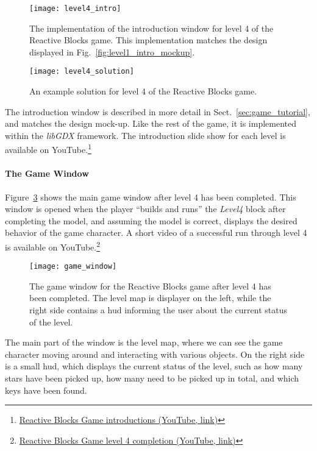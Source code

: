 \begin{figure}[htp]
	\centering
	\texttt{[image: level4\_intro]}
	\caption[Reactive Blocks game Level 4 introduction]{The implementation of the introduction window for level 4 of the Reactive Blocks game. This implementation matches the design displayed in Fig.~\ref{fig:level1_intro_mockup}.}
	\label{fig:level4_intro}
\end{figure}

\begin{figure}[htp]
	\centering
	\texttt{[image: level4\_solution]}
	\caption[Reactive Blocks game Level 4 solution]{An example solution for level 4 of the Reactive Blocks game.}
	\label{fig:level4_solution}
\end{figure}

\noindent
The introduction window is described in more detail in Sect.~\ref{sec:game_tutorial}, and matches the design mock-up. Like the rest of the game, it is implemented within the \emph{libGDX} framework. The introduction slide show for each level is available on YouTube.\footnote{\href{http://www.youtube.com/playlist?list=PLoqEHDwb_4oD8LT7n-7Q1dx67HxXwJN_K}{Reactive Blocks Game introductions (YouTube, link)}}

\paragraph{The Game Window}
Figure~\ref{fig:game_window} shows the main game window after level 4 has been completed. This window is opened when the player ``builds and runs'' the \emph{Level4} block after completing the model, and assuming the model is correct, displays the desired behavior of the game character. A short video of a successful run through level 4 is available on YouTube.\footnote{\href{http://youtu.be/Fe3CWCLogGs}{Reactive Blocks Game level 4 completion (YouTube, link)}}

\begin{figure}[htp]
	\centering
	\texttt{[image: game\_window]}
	\caption[Reactive Blocks game window]{The game window for the Reactive Blocks game after level 4 has been completed. The level map is displayer on the left, while the right side contains a \gls{hud} informing the user about the current status of the level.}
	\label{fig:game_window}
\end{figure}

\noindent
The main part of the window is the level map, where we can see the game character moving around and interacting with various objects. On the right side is a small \gls{hud}, which displays the current status of the level, such as how many stars have been picked up, how many need to be picked up in total, and which keys have been found.

